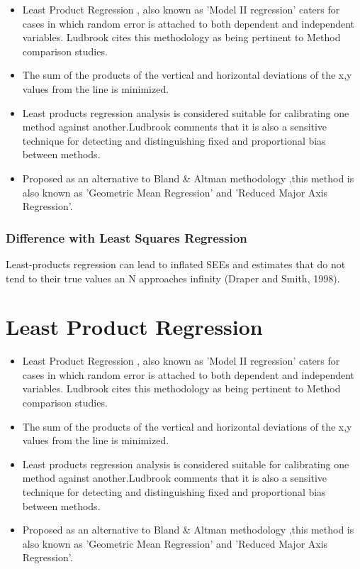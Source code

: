 \documentclass[12pt, a4paper]{report}
\theoremstyle{plain}
\theoremstyle{definition}
\theoremstyle{remark}
\begin{document}
\begin{itemize}
	\item Least Product Regression , also known as 'Model II regression'
	caters for cases in which random error is attached to both
	dependent and independent variables. Ludbrook cites this
	methodology as being pertinent to Method comparison studies.
	
	\item 
	The sum of the products of the vertical and horizontal deviations
	of the x,y values from the line is minimized.
	
	\item 
	Least products regression analysis is considered suitable for
	calibrating one method against another.Ludbrook comments that it
	is also a sensitive technique for detecting and distinguishing
	fixed and proportional bias between methods.
	
	\item 
	Proposed as an alternative to Bland \& Altman methodology ,this
	method is also known as 'Geometric Mean Regression' and 'Reduced
	Major Axis Regression'.
\end{itemize}

\subsubsection{Difference with Least Squares Regression}
Least-products regression can lead to inflated SEEs and estimates
that do not tend to their true values an N approaches infinity
(Draper and Smith, 1998).



\section{Least Product Regression}

\begin{itemize}
	\item Least Product Regression , also known as 'Model II regression'
	caters for cases in which random error is attached to both
	dependent and independent variables. Ludbrook cites this
	methodology as being pertinent to Method comparison studies.
	
	\item 
	The sum of the products of the vertical and horizontal deviations
	of the x,y values from the line is minimized.
	
	\item 
	Least products regression analysis is considered suitable for
	calibrating one method against another.Ludbrook comments that it
	is also a sensitive technique for detecting and distinguishing
	fixed and proportional bias between methods.
	
	\item 
	Proposed as an alternative to Bland \& Altman methodology ,this
	method is also known as 'Geometric Mean Regression' and 'Reduced
	Major Axis Regression'.
\end{itemize}
\end{document}
